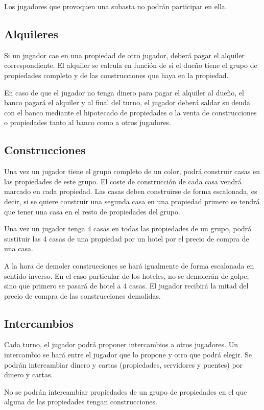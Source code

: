 Los jugadores que provoquen una subasta no podrán participar en ella.

\subsection{Alquileres}
Si un jugador cae en una propiedad de otro jugador, deberá pagar el alquiler
correspondiente. El alquiler se calcula en función de si el dueño tiene el grupo 
de propiedades completo y de las construcciones que haya en la propiedad.

En caso de que el jugador no tenga dinero para pagar el alquiler al dueño,
el banco pagará el alquiler y al final del turno, el jugador deberá saldar 
su deuda con el banco mediante el hipotecado de propiedades o la venta de
construcciones o propiedades tanto al banco como a otros jugadores.

\subsection{Construcciones}
Una vez un jugador tiene el grupo completo de un color, podrá construir
casas en las propiedades de este grupo. El coste de construcción de cada 
casa vendrá marcado en cada propiedad. Las casas deben construirse de forma 
escalonada, es decir, si se quiere construir una segunda casa en una propiedad 
primero se tendrá que tener una casa en el resto de propiedades del grupo.

Una vez un jugador tenga 4 casas en todas las propiedades de un grupo, podrá
sustituir las 4 casas de una propiedad por un hotel por el precio de compra
de una casa.

A la hora de demoler construcciones se hará igualmente de forma escalonada en 
sentido inverso. En el caso particular de los hoteles, no se demolerán de golpe,
sino que primero se pasará de hotel a 4 casas.
El jugador recibirá la mitad del precio de compra de las construcciones demolidas.

\subsection{Intercambios}
\label{sec:intercambios}
Cada turno, el jugador podrá proponer intercambios a otros jugadores. Un 
intercambio se hará entre el jugador que lo propone y otro que podrá elegir.
Se podrán intercambiar dinero y cartas (propiedades, servidores y puentes)
por dinero y cartas. 

No se podrán intercambiar propiedades de un grupo de propiedades en el que
alguna de las propiedades tengan construcciones.

